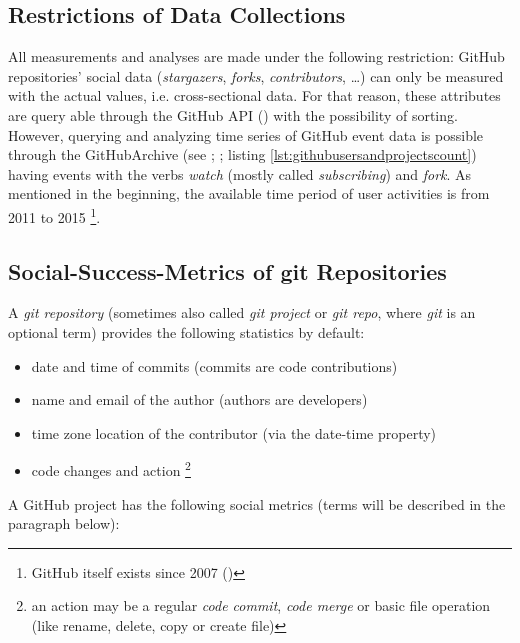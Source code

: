 

\clearpage

\subsection{Restrictions of Data Collections}

All measurements and analyses are made under the following restriction: GitHub repositories' social data (\textit{stargazers}, \textit{forks}, \textit{contributors}, …) can only be measured with the actual values, i.e. cross-sectional data. For that reason, these attributes are query able through the GitHub API (\cite{GitHubApi}) with the possibility of sorting. However, querying and analyzing time series of GitHub event data is possible through the GitHubArchive (see \cite{grigorik2012github}; \cite{AnalyzingMillionsOfGitHubCommits:online}; listing \ref{lst:githubusersandprojectscount}) having events with the verbs \textit{watch} (mostly called \textit{subscribing}) and \textit{fork}. As mentioned in the beginning, the available time period of user activities is from 2011 to 2015 \footnote{GitHub itself exists since 2007 (\cite{GitHubCEOAndCo-FounderChrisWanstrathKeynoting:online})}.

\subsection{Social-Success-Metrics of git Repositories}
\label{sec:social-success-metrics}

A \textit{git repository} (sometimes also called \textit{git project} or \textit{git repo}, where \textit{git} is an optional term) provides the following statistics by default:

\begin{itemize}
	\item date and time of commits (commits are code contributions)
	\item name and email of the author (authors are developers)
	\item time zone location of the contributor (via the date-time property)
	\item code changes and action \footnote{an action may be a regular \textit{code commit}, \textit{code merge} or basic file operation (like rename, delete, copy or create file)}
\end{itemize}

A GitHub project has the following social metrics (terms will be described in the paragraph below):


